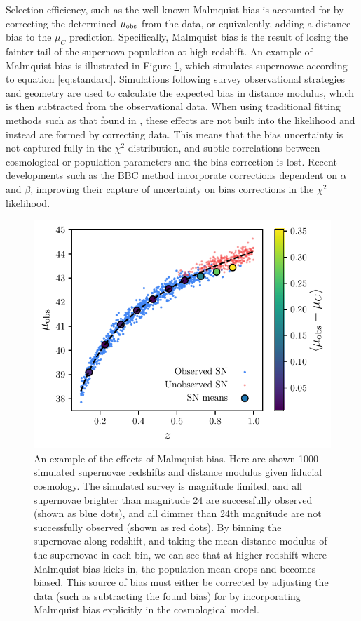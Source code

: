 \documentclass[a4paper,fleqn,usenatbib,manuscript]{emulateapj}
\begin{document}
Selection efficiency, such as the well known Malmquist bias \citep{MalmquistK.G.1922} is accounted for by correcting the determined $\mu_{\rm obs}$ from the data, or equivalently, adding a distance bias to the $\mu_C$ prediction. Specifically, Malmquist bias is the result of losing the fainter tail of the supernova population at high redshift. An example of Malmquist bias is illustrated in Figure \ref{fig:malmquist}, which simulates supernovae according to equation \eqref{eq:standard}. Simulations following survey observational strategies and geometry are used to calculate the expected bias in distance modulus, which is then subtracted from the observational data. When using traditional fitting methods such as that found in \citet{Betoule2014}, these effects are not built into the likelihood and instead are formed by correcting data. This means that the bias uncertainty is not captured fully in the $\chi^2$ distribution, and subtle correlations between cosmological or population parameters and the bias correction is lost. Recent developments such as the BBC method \citep{Kessler2017} incorporate corrections dependent on $\alpha$ and $\beta$, improving their capture of uncertainty on bias corrections in the $\chi^2$ likelihood.

\begin{figure}
	\begin{center}
		\includegraphics[width=\columnwidth]{malmquist.pdf}
	\end{center}
	\caption{An example of the effects of Malmquist bias. Here are shown 1000 simulated supernovae redshifts and distance modulus given fiducial cosmology. The simulated survey is magnitude limited, and all supernovae brighter than magnitude 24 are successfully observed (shown as blue dots), and all dimmer than 24th magnitude are not successfully observed (shown as red dots). By binning the supernovae along redshift, and taking the mean distance modulus of the supernovae in each bin, we can see that at higher redshift where Malmquist bias kicks in, the population mean drops and becomes biased. This source of bias must either be corrected by adjusting the data (such as subtracting the found bias) for by incorporating Malmquist bias explicitly in the cosmological model.}
	\label{fig:malmquist}
\end{figure}
\end{document}
